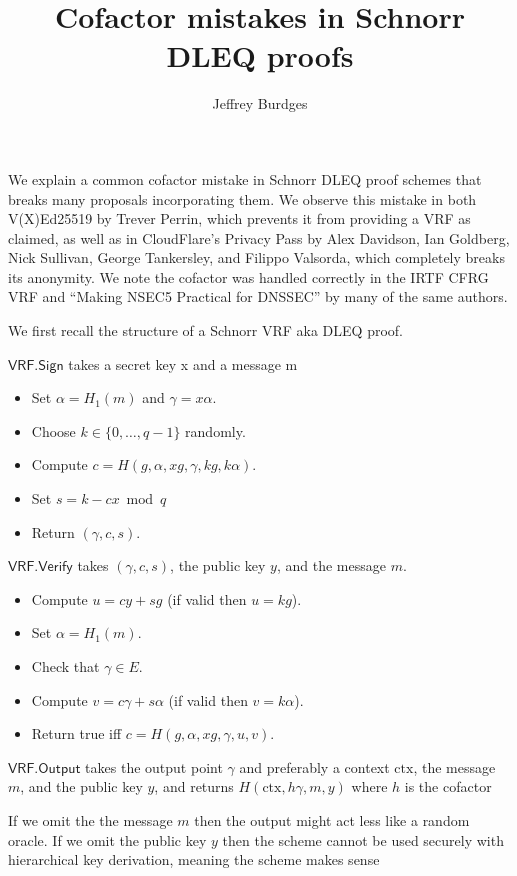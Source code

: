 \documentclass{article}
\title{Cofactor mistakes in Schnorr DLEQ proofs}
\author{Jeffrey Burdges}
\newcommand{\algo}[1]{\ensuremath{\mathsf{#1}}}
\newcommand{\VRF}{\algo{VRF}}
\newcommand{\Sign}{\algo{Sign}}
\newcommand{\Verify}{\algo{Verify}}
\newcommand{\Output}{\algo{Output}}
\begin{document}
\maketitle

We explain a common cofactor mistake in Schnorr DLEQ proof schemes that breaks many proposals incorporating them.  We observe this mistake in both V(X)Ed25519 by Trever Perrin, which prevents it from providing a VRF as claimed, as well as in CloudFlare’s Privacy Pass by Alex Davidson, Ian Goldberg, Nick Sullivan, George Tankersley, and Filippo Valsorda, which completely breaks its anonymity.  We note the cofactor was handled correctly in the IRTF CFRG VRF and “Making NSEC5 Practical for DNSSEC” by many of the same authors.

We first recall the structure of a Schnorr VRF aka DLEQ proof.

$\VRF.\Sign$ takes a secret key x and a message m
\begin{itemize}
\item  Set $\alpha = H_1(m)$ and $\gamma = x \alpha$.
\item  Choose $k \in \{0,\ldots,q-1\}$ randomly.
\item  Compute $c = H(g,\alpha,x g,\gamma,k g,k \alpha)$.
\item  Set $s = k - c x \bmod q$  
\item  Return $(\gamma,c,s)$.
\end{itemize}

$\VRF.\Verify$ takes $(\gamma,c,s)$, the public key $y$, and the message $m$.
\begin{itemize}
\item  Compute $u = c y +  sg$  (if valid then $u = k g$).
\item  Set $\alpha = H_1(m)$.
\item  Check that $\gamma \in E$.
\item  Compute $v = c \gamma + s \alpha$  (if valid then $v = k \alpha$).
\item  Return true iff $c = H(g,\alpha,x g,\gamma,u,v)$.
\end{itemize}

$\VRF.\Output$ takes the output point $\gamma$ and preferably a context $\textrm{ctx}$, the message $m$, and the public key $y$, and returns $H(\textrm{ctx},h \gamma,m,y)$ where $h$ is the cofactor

If we omit the the message $m$ then the output might act less like a random oracle.  If we omit the public key $y$ then the scheme cannot be used securely with hierarchical key derivation, meaning the scheme makes sense 
\end{document}
